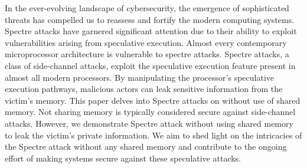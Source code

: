 \documentclass{main}
\begin{document}
In the ever-evolving landscape of cybersecurity, the emergence of sophisticated threats has compelled us to reassess and fortify the modern computing systems. Spectre attacks have garnered significant attention due to their ability to exploit vulnerabilities arising from speculative execution. Almost every contemporary microprocessor architecture is vulnerable to spectre attacks. Spectre attacks, a class of side-channel attacks, exploit the speculative execution feature present in almost all modern processors. By manipulating the processor's speculative execution pathways, malicious actors can leak sensitive information from the victim's memory. This paper delves into Spectre attacks on without use of shared memory. Not sharing memory is typically considered secure against side-channel attacks. However, we demonstrate Spectre attack without using shared memory to leak the victim's private information. We aim to shed light on the intricacies of the Spectre attack without any shared memory and contribute to the ongoing effort of making systems secure against these speculative attacks.
\end{document}

